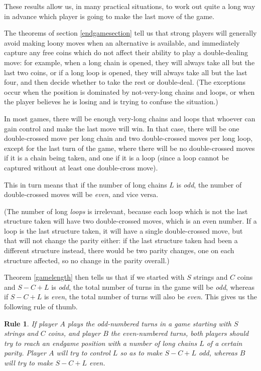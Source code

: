\documentclass[a4paper,twocolumn]{article}
\newtheorem{parityruleofthumb}[thm]{Rule}
\begin{document}
These results allow us, in many practical situations, to work out
quite a long way in advance which player is going to make the last
move of the game.

The theorems of section \ref{endgamesection} tell us that strong
players will generally avoid making loony moves when an alternative is
available, and immediately capture any free coins which do not affect
their ability to play a double-dealing move: for example, when a long
chain is opened, they will always take all but the last two coins, or
if a long loop is opened, they will always take all but the last four,
and then decide whether to take the rest or double-deal. (The
exceptions occur when the position is dominated by not-very-long
chains and loops, or when the player believes he is losing and is
trying to confuse the situation.)

In most games, there will be enough very-long chains and loops that
whoever can gain control and make the last move will win. In that
case, there will be one double-crossed move per long chain and two
double-crossed moves per long loop, except for the last turn of the
game, where there will be no double-crossed moves if it is a chain
being taken, and one if it is a loop (since a loop cannot be captured
without at least one double-cross move).

This in turn means that if the number of long chains $L$ is
\emph{odd}, the number of double-crossed moves will be \emph{even},
and vice versa.

(The number of long \emph{loops} is irrelevant, because each loop
which is not the last structure taken will have two double-crossed
moves, which is an even number. If a loop is the last structure taken,
it will have a single double-crossed move, but that will not change
the parity either: if the last structure taken had been a different
structure instead, there would be two parity changes, one on each
structure affected, so no change in the parity overall.)

Theorem \ref{gamelength} then tells us that if we started with $S$
strings and $C$ coins and $S-C+L$ is \emph{odd}, the total number of
turns in the game will be \emph{odd}, whereas if $S-C+L$ is
\emph{even}, the total number of turns will also be \emph{even}. This
gives us the following rule of thumb.

\begin{parityruleofthumb}\label{parityruleofthumb}
  If player $A$ plays the odd-numbered turns in a game starting with
  $S$ strings and $C$ coins, and player $B$ the even-numbered turns,
  both players should try to reach an endgame position with a number
  of long chains $L$ of a certain parity. Player $A$ will try to
  control $L$ so as to make $S-C+L$ \emph{odd}, whereas $B$ will try
  to make $S-C+L$ \emph{even}.
\end{parityruleofthumb}
\end{document}
